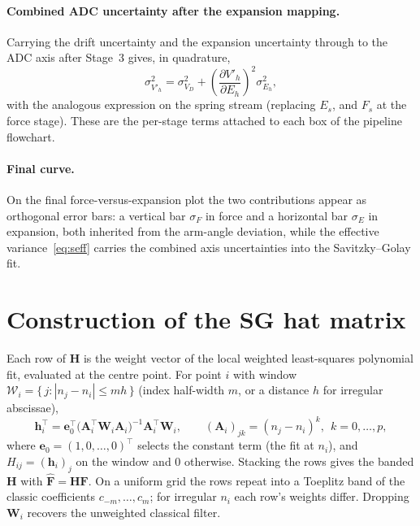 \documentclass[11pt]{article}
\newcommand{\dset}[1]{\mathbf{#1}}          %
\newcommand{\unc}[1]{\sigma_{#1}}           %
\begin{document}
\paragraph{Combined ADC uncertainty after the expansion mapping.}
Carrying the drift uncertainty and the expansion uncertainty through to the ADC axis after
Stage~3 gives, in quadrature,
\begin{equation}
\unc{V'_h}^2=\unc{V_D}^2+\left(\frac{\partial V'_h}{\partial E_h}\right)^{\!2}\unc{E_h}^2,
\end{equation}
with the analogous expression on the spring stream (replacing $E_s$, and $F_s$ at the force
stage). These are the per-stage terms attached to each box of the pipeline flowchart.

\paragraph{Final curve.}
On the final force-versus-expansion plot the two contributions appear as orthogonal error
bars: a vertical bar $\unc{F}$ in force and a horizontal bar $\unc{E}$ in expansion, both
inherited from the arm-angle deviation, while the effective variance~\eqref{eq:seff} carries
the combined axis uncertainties into the Savitzky--Golay fit.

\appendix
\section{Construction of the SG hat matrix}
\label{app:hat}
Each row of $\dset{H}$ is the weight vector of the local weighted least-squares polynomial fit,
evaluated at the centre point. For point $i$ with window
$\mathcal{W}_i=\{\,j:|n_j-n_i|\le mh\,\}$ (index half-width $m$, or a distance $h$ for irregular
abscissae),
\begin{equation}
\dset{h}_i^{\top}=\dset{e}_0^{\top}\bigl(\dset{A}_i^{\top}\dset{W}_i\dset{A}_i\bigr)^{-1}\dset{A}_i^{\top}\dset{W}_i,
\qquad
(\dset{A}_i)_{jk}=(n_j-n_i)^{k},\ \ k=0,\dots,p,
\end{equation}
where $\dset{e}_0=(1,0,\dots,0)^{\top}$ selects the constant term (the fit at $n_i$), and
$H_{ij}=(\dset{h}_i)_j$ on the window and $0$ otherwise. Stacking the rows gives the banded
$\dset{H}$ with $\hat{\dset{F}}=\dset{H}\dset{F}$. On a uniform grid the rows repeat into a
Toeplitz band of the classic coefficients $c_{-m},\dots,c_{m}$; for irregular $n_i$ each row's
weights differ. Dropping $\dset{W}_i$ recovers the unweighted classical filter.
\end{document}
